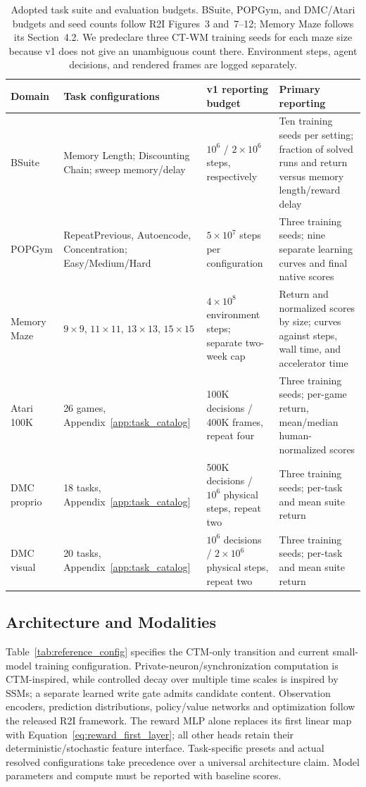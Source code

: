 \documentclass{article}
\begin{document}
\begin{table}[t]
\centering
\small
\begin{tabular}{@{}p{2.15cm}p{4.15cm}p{3.55cm}p{5.75cm}@{}}
\toprule
Domain & Task configurations & v1 reporting budget & Primary reporting\\
\midrule
BSuite & Memory Length; Discounting Chain; sweep memory/delay & $10^6$ / $2\times10^6$ steps, respectively & Ten training seeds per setting; fraction of solved runs and return versus memory length/reward delay\\
POPGym & RepeatPrevious, Autoencode, Concentration; Easy/Medium/Hard & $5\times10^7$ steps per configuration & Three training seeds; nine separate learning curves and final native scores\\
Memory Maze & $9\times9$, $11\times11$, $13\times13$, $15\times15$ & $4\times10^8$ environment steps; separate two-week cap & Return and normalized scores by size; curves against steps, wall time, and accelerator time\\
Atari 100K & 26 games, Appendix~\ref{app:task_catalog} & 100K decisions / 400K frames, repeat four & Three training seeds; per-game return, mean/median human-normalized scores\\
DMC proprio & 18 tasks, Appendix~\ref{app:task_catalog} & 500K decisions / $10^6$ physical steps, repeat two & Three training seeds; per-task and mean suite return\\
DMC visual & 20 tasks, Appendix~\ref{app:task_catalog} & $10^6$ decisions / $2\times10^6$ physical steps, repeat two & Three training seeds; per-task and mean suite return\\
\bottomrule
\end{tabular}
\caption{Adopted task suite and evaluation budgets. BSuite, POPGym, and DMC/Atari budgets and seed counts follow R2I Figures~3 and~7--12; Memory Maze follows its Section~4.2. We predeclare three CT-WM training seeds for each maze size because v1 does not give an unambiguous count there. Environment steps, agent decisions, and rendered frames are logged separately.}
\label{tab:benchmark_protocol}
\end{table}

\subsection{Architecture and Modalities}

Table~\ref{tab:reference_config} specifies the CTM-only transition and current small-model training configuration. Private-neuron/synchronization computation is CTM-inspired, while controlled decay over multiple time scales is inspired by SSMs; a separate learned write gate admits candidate content. Observation encoders, prediction distributions, policy/value networks and optimization follow the released R2I framework. The reward MLP alone replaces its first linear map with Equation~\eqref{eq:reward_first_layer}; all other heads retain their deterministic/stochastic feature interface. Task-specific presets and actual resolved configurations take precedence over a universal architecture claim. Model parameters and compute must be reported with baseline scores.
\end{document}
